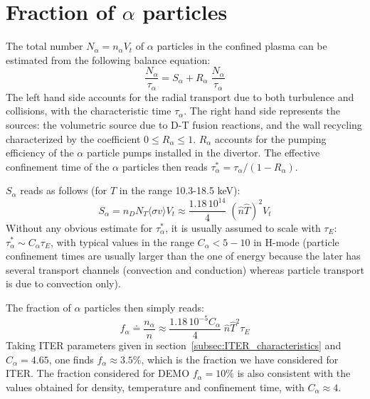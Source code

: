 \documentclass[12pt]{iopart}
\begin{document}
\section{Fraction of $\alpha$ particles}
\label{appendix:alpha_particles}

The total number $N_\alpha = n_\alpha V_t$ of $\alpha$ particles in the confined plasma can be estimated from the following balance equation: 
\begin{equation}
\frac{N_\alpha}{\tau_\alpha} = S_\alpha + R_\alpha\; \frac{N_\alpha}{\tau_\alpha}
\end{equation}
The left hand side accounts for the radial transport due to both turbulence and collisions, with the characteristic time $\tau_\alpha$. The right hand side represents the sources: the volumetric source due to D-T fusion reactions, and the wall recycling characterized by the coefficient $0 \leq R_\alpha \leq 1$. $R_\alpha$ accounts for the pumping efficiency of the $\alpha$ particle pumps installed in the divertor. The effective confinement time of the $\alpha$ particles then reads $\tau_\alpha^* = \tau_\alpha / (1-R_\alpha)$.

$S_\alpha$ reads as follows (for $T$ in the range 10.3-18.5 keV):
\begin{equation}
S_\alpha = n_D N_T \langle \sigma v\rangle V_t \approx \frac{1.18\, 10^{14}}{4}\; (\widehat n \widehat T)^2  V_t
\end{equation}
Without any obvious estimate for $\tau_\alpha^*$, it is usually assumed to scale with $\tau_E$: $\tau_\alpha^* \sim C_\alpha \tau_E$, with typical values in the range $C_\alpha < 5-10$ in H-mode \cite[section 2.3]{ITERphysics_chap4} (particle confinement times are usually larger than the one of energy because the later has several transport channels (convection and conduction) whereas particle transport is due to convection only).

The fraction of $\alpha$ particles then simply reads:
\begin{equation}
f_\alpha \doteq \frac{n_\alpha}{n} \approx \frac{1.18\, 10^{-5}C_\alpha}{4}\; \widehat n \widehat T^2 \tau_E
\end{equation}
Taking ITER parameters given in section~\ref{subsec:ITER_characteristics} and $C_\alpha=4.65$, one finds $f_\alpha \approx 3.5\%$, which is the fraction we have considered for ITER. The fraction considered for DEMO $f_\alpha =10\%$ is also consistent with the values obtained for density, temperature and confinement time, with $C_\alpha \approx 4$.

\vspace{10pt}


\end{document}

